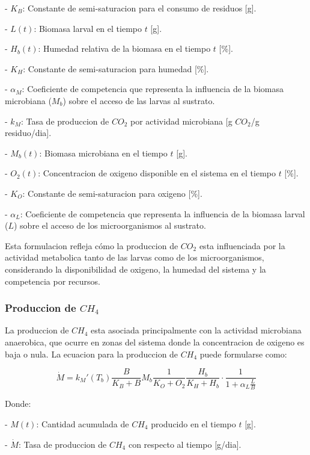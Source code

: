 - $K_B$: Constante de semi-saturacion para el consumo de residuos [g].

- $L(t)$: Biomasa larval en el tiempo $t$ [g].

- $H_b(t)$: Humedad relativa de la biomasa en el tiempo $t$ [\%].

- $K_H$: Constante de semi-saturacion para humedad [\%].

- $\alpha_M$: Coeficiente de competencia que representa la influencia de la biomasa microbiana ($M_b$) sobre el acceso de las larvas al sustrato.

- $k_M$: Tasa de produccion de $CO_2$ por actividad microbiana [g $CO_2$/g residuo/dia].

- $M_b(t)$: Biomasa microbiana en el tiempo $t$ [g].

- $O_2(t)$: Concentracion de oxigeno disponible en el sistema en el tiempo $t$ [\%].

- $K_O$: Constante de semi-saturacion para oxigeno [\%].

- $\alpha_L$: Coeficiente de competencia que representa la influencia de la biomasa larval ($L$) sobre el acceso de los microorganismos al sustrato.

\vspace{1cm}
Esta formulacion refleja cómo la produccion de $CO_2$ esta influenciada por la actividad metabolica tanto de las larvas como de los microorganismos, considerando la disponibilidad de oxigeno, la humedad del sistema y la competencia por recursos.

\subsubsection{Produccion de $CH_4$}

La produccion de $CH_4$ esta asociada principalmente con la actividad microbiana anaerobica, que ocurre en zonas del sistema donde la concentracion de oxigeno es baja o nula. La ecuacion para la produccion de $CH_4$ puede formularse como:

\begin{equation}
\dot{M} = k_M'(T_b) \frac{B}{K_B + B} M_b \frac{1}{K_O + O_2} \frac{H_b}{K_H + H_b} \cdot \frac{1}{1 + \alpha_L \frac{L}{B}}
\end{equation}

Donde:

- $M(t)$: Cantidad acumulada de $CH_4$ producido en el tiempo $t$ [g].

- $\dot{M}$: Tasa de produccion de $CH_4$ con respecto al tiempo [g/dia].

